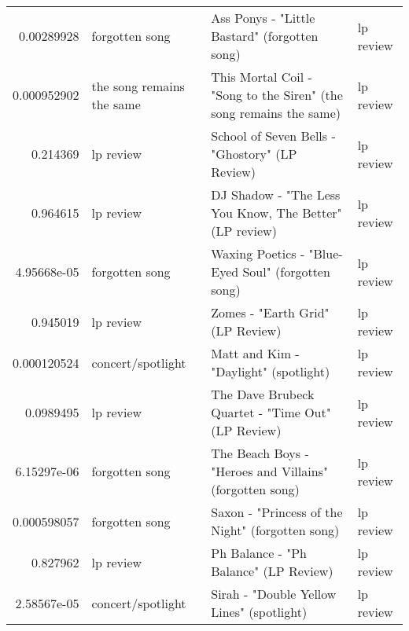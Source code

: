 \documentclass[letterpaper,10pt]{article}
\begin{document}
\begin{table}[H]
\begin{adjustbox}{max width=\linewidth}
\begin{tabular}{rlll}
  0.00289928  & forgotten song            & Ass Ponys - "Little Bastard" (forgotten song)                                                                & lp review                 \\
  0.000952902 & the song remains the same & This Mortal Coil - "Song to the Siren" (the song remains the same)                                           & lp review                 \\
  0.214369    & lp review                 & School of Seven Bells - "Ghostory" (LP Review)                                                               & lp review                 \\
  0.964615    & lp review                 & DJ Shadow - "The Less You Know, The Better" (LP review)                                                      & lp review                 \\
  4.95668e-05 & forgotten song            & Waxing Poetics - "Blue-Eyed Soul" (forgotten song)                                                           & lp review                 \\
  0.945019    & lp review                 & Zomes - "Earth Grid" (LP Review)                                                                             & lp review                 \\
  0.000120524 & concert/spotlight         & Matt and Kim - "Daylight" (spotlight)                                                                        & lp review                 \\
  0.0989495   & lp review                 & The Dave Brubeck Quartet - "Time Out" (LP Review)                                                            & lp review                 \\
  6.15297e-06 & forgotten song            & The Beach Boys - "Heroes and Villains" (forgotten song)                                                      & lp review                 \\
  0.000598057 & forgotten song            & Saxon - "Princess of the Night" (forgotten song)                                                             & lp review                 \\
  0.827962    & lp review                 & Ph Balance - "Ph Balance" (LP Review)                                                                        & lp review                 \\
  2.58567e-05 & concert/spotlight         & Sirah - "Double Yellow Lines" (spotlight)                                                                    & lp review                 \\

\end{tabular}
\end{adjustbox}
\end{table}
\end{document}
